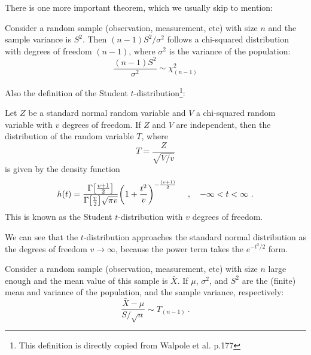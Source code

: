 There is one more important theorem, which we usually skip to mention:

\begin{thm} \label{thm: s and sigma}
  Consider a random sample (observation, measurement, etc) with size $ n $ and the sample variance is $ S^2 $. Then $ (n - 1) S^2 / \sigma^2 $ follows a chi-squared distribution with degrees of freedom $ (n - 1) $, where $ \sigma^2 $ is the variance of the population:
  \begin{equation}
    \frac{(n - 1) S^2}{\sigma^2 } \sim \chi^2_{(n-1)}
  \end{equation}
\end{thm}

Also the definition of the Student $ t $-distribution\footnote{This definition is directly copied from Walpole et al. p.177}:

\begin{defn}\label{def: t-distn}
  Let $ Z $ be a standard normal random variable and $ V $ a chi-squared random variable with $ v $ degrees of freedom. If $ Z $ and $ V $ are independent, then the distribution of the random variable $ T $, where
  \begin{equation}
    T = \frac{Z}{\sqrt{V /v}}
  \end{equation}
  is given by the density function
  \begin{equation}
    h(t) = \frac{\Gamma \qty[ \frac{v+1}{2} ]}{\Gamma \qty[\frac{v}{2}] \sqrt{\pi v}}
      \qty( 1 + \frac{t^2}{v} )^{-\frac{(v+1)}{2}}
    \quad ~, \quad
    -\infty < t < \infty ~.
  \end{equation}
  This is known as the Student $ t $-distribution with $ v $ degrees of freedom.
\end{defn}

We can see that the $ t $-distribution approaches the standard normal distribution as the degrees of freedom $ v \rightarrow \infty $, because the power term takes the $ e^{-t^2 / 2} $ form. 


\begin{thm} \label{thm: practical clt}
  Consider a random sample (observation, measurement, etc) with size $ n $ large enough and the mean value of this sample is $ \bar{X} $. If $ \mu $, $ \sigma^2 $, and $ S^2 $ are the (finite) mean and variance of the population, and the sample variance, respectively:
  \begin{equation}
    \frac{\bar{X} - \mu}{S / \sqrt{{n}}} \sim T_{(n - 1)} ~.
  \end{equation}
\end{thm}

